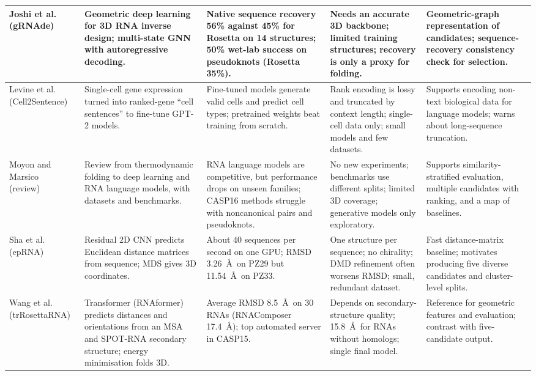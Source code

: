 \documentclass{FastFyp}
\begin{document}
{\begin{longtable}{|p{}|p{}|p{}|p{}|p{}|}
Joshi et al.~\cite{joshi2025grnade} (gRNAde) &
Geometric deep learning for 3D RNA inverse design; multi-state GNN with autoregressive decoding. &
Native sequence recovery 56\% against 45\% for Rosetta on 14 structures; 50\% wet-lab success on pseudoknots (Rosetta 35\%). &
Needs an accurate 3D backbone; limited training structures; recovery is only a proxy for folding. &
Geometric-graph representation of candidates; sequence-recovery consistency check for selection.\\ \hline

Levine et al.~\cite{levine2024cell2sentence} (Cell2Sentence) &
Single-cell gene expression turned into ranked-gene ``cell sentences'' to fine-tune GPT-2 models. &
Fine-tuned models generate valid cells and predict cell types; pretrained weights beat training from scratch. &
Rank encoding is lossy and truncated by context length; single-cell data only; small models and few datasets. &
Supports encoding non-text biological data for language models; warns about long-sequence truncation.\\ \hline

Moyon and Marsico~\cite{moyon2026ml} (review) &
Review from thermodynamic folding to deep learning and RNA language models, with datasets and benchmarks. &
RNA language models are competitive, but performance drops on unseen families; CASP16 methods struggle with noncanonical pairs and pseudoknots. &
No new experiments; benchmarks use different splits; limited 3D coverage; generative models only exploratory. &
Supports similarity-stratified evaluation, multiple candidates with ranking, and a map of baselines.\\ \hline

Sha et al.~\cite{sha2024eprna} (epRNA) &
Residual 2D CNN predicts Euclidean distance matrices from sequence; MDS gives 3D coordinates. &
About 40 sequences per second on one GPU; RMSD 3.26~\AA\ on PZ29 but 11.54~\AA\ on PZ33. &
One structure per sequence; no chirality; DMD refinement often worsens RMSD; small, redundant dataset. &
Fast distance-matrix baseline; motivates producing five diverse candidates and cluster-level splits.\\ \hline

Wang et al.~\cite{wang2023trrosettarna} (trRosettaRNA) &
Transformer (RNAformer) predicts distances and orientations from an MSA and SPOT-RNA secondary structure; energy minimisation folds 3D. &
Average RMSD 8.5~\AA\ on 30 RNAs (RNAComposer 17.4~\AA); top automated server in CASP15. &
Depends on secondary-structure quality; 15.8~\AA\ for RNAs without homologs; single final model. &
Reference for geometric features and evaluation; contrast with five-candidate output.\\ \hline


\end{longtable}}
\end{document}

